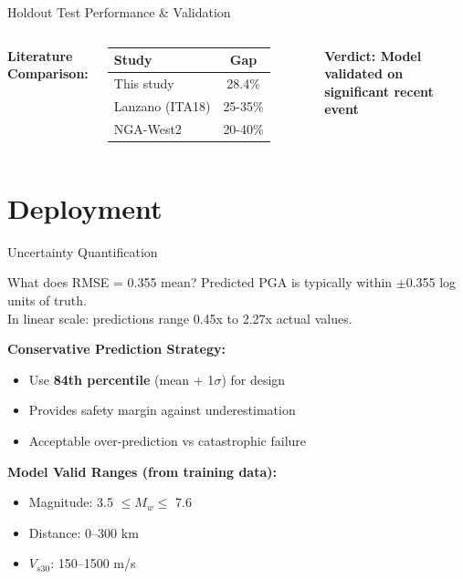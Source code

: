 \documentclass[aspectratio=169,11pt]{beamer}
\begin{document}
\begin{frame}{Holdout Test Performance \& Validation}
\begin{columns}[T]
\vspace{0.2cm}
\textbf{Literature Comparison:}
\begin{table}
\centering
\scriptsize
\begin{tabular}{@{}lc@{}}
\toprule
\textbf{Study} & \textbf{Gap} \\
\midrule
This study & 28.4\% \\
Lanzano (ITA18) & 25-35\% \\
NGA-West2 & 20-40\% \\
\bottomrule
\end{tabular}
\end{table}

\vspace{0.2cm}
\textcolor{successgreen}{\textbf{Verdict: Model validated on significant recent event}}
\end{columns}
\end{frame}

\section{Deployment}

\begin{frame}{Uncertainty Quantification}
\begin{block}{What does RMSE = 0.355 mean?}
Predicted PGA is typically within $\pm$0.355 log units of truth.\\
In linear scale: predictions range 0.45x to 2.27x actual values.
\end{block}

\vspace{0.3cm}
\textbf{Conservative Prediction Strategy:}
\begin{itemize}
    \item Use \textbf{84th percentile} (mean + 1$\sigma$) for design
    \item Provides safety margin against underestimation
    \item Acceptable over-prediction vs catastrophic failure
\end{itemize}

\vspace{0.3cm}
\textbf{Model Valid Ranges (from training data):}
\begin{itemize}
    \item Magnitude: 3.5 $\leq M_w \leq$ 7.6
    \item Distance: 0--300 km
    \item $V_{s30}$: 150--1500 m/s
\end{itemize}
\end{frame}
\end{document}
